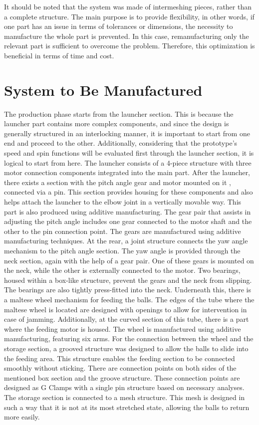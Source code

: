 \documentclass[12pt]{article}
\begin{document}
It should be noted that the system was made of intermeshing pieces, rather than a complete structure. The main purpose is to provide flexibility, in other words, if one part has an issue in terms of tolerances or dimensions, the necessity to manufacture the whole part is prevented. In this case, remanufacturing only the relevant part is sufficient to overcome the problem. Therefore, this optimization is beneficial in terms of time and cost.

\section{System to Be Manufactured}
The production phase starts from the launcher section. This is because the launcher part contains more complex components, and since the design is generally structured in an interlocking manner, it is important to start from one end and proceed to the other. Additionally, considering that the prototype’s speed and spin functions will be evaluated first through the launcher section, it is logical to start from here. The launcher consists of a 4-piece structure with three motor connection components integrated into the main part.
After the launcher, there exists a section with the pitch angle gear and motor mounted on it , connected via a pin. This section provides housing for these components and also helps attach the launcher to the elbow joint in a vertically movable way. This part is also produced using additive manufacturing. The gear pair that assists in adjusting the pitch angle includes one gear connected to the motor shaft and the other to the pin connection point. The gears are manufactured using additive manufacturing techniques.
At the rear, a joint structure connects the yaw angle mechanism to the pitch angle section.
The yaw angle is provided through the neck section, again with the help of a gear pair. One of these gears is mounted on the neck, while the other is externally connected to the motor. Two bearings, housed within a box-like structure, prevent the gears and the neck from slipping. The bearings are also tightly press-fitted into the neck.
Underneath this, there is a maltese wheel mechanism for feeding the balls. The edges of the tube where the maltese wheel is located are designed with openings to allow for intervention in case of jamming. Additionally, at the curved section of this tube, there is a part where the feeding motor is housed. The wheel is manufactured using additive manufacturing, featuring six arms.
For the connection between the wheel and the storage section, a grooved structure was designed to allow the balls to slide into the feeding area. This structure enables the feeding
section to be connected smoothly without sticking. There are connection points on both sides of the mentioned box section and the groove structure. These connection points are designed as G Clamps with a single pin structure based on necessary analyses.
The storage section is connected to a mesh structure. This mesh is designed in such a way that it is not at its most stretched state, allowing the balls to return more easily.
\end{document}
